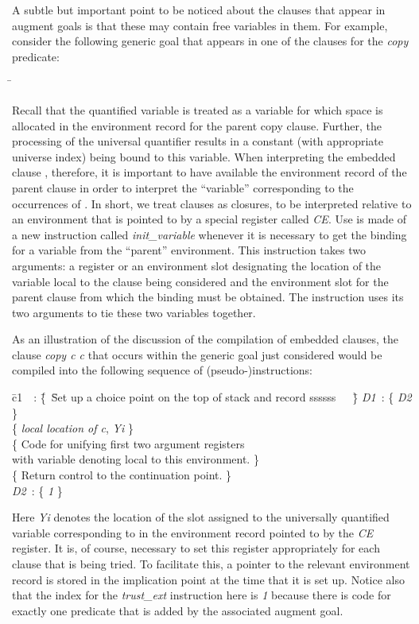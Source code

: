 A subtle but important point to be noticed about the clauses that
appear in augment goals is that these may contain free variables in
them. For example, consider the following generic goal that appears in
one of the clauses for the {\it copy} predicate:
\begin{tabbing}
\qquad\=\kill
\>
\end{tabbing}
Recall that the quantified variable  is treated as a variable for
which space is allocated in the environment record for the parent copy
clause. Further, the processing of the universal quantifier results in
a constant (with appropriate universe index) being bound to this
variable. When interpreting the embedded clause ,
therefore, it is important to have available the environment record of
the parent clause in order to interpret the ``variable'' corresponding
to the occurrences of . In short, we treat clauses as closures, to
be interpreted relative to an environment that is pointed to by a
special register called {\it CE}. Use is made of a new instruction
called {\it init\_variable} whenever it is necessary to get the
binding for a variable from the ``parent'' environment. This
instruction takes two arguments: a register or an environment slot
designating the location of the variable local to the clause being
considered and the environment slot for the parent clause from which
the binding must be obtained. The instruction uses its two arguments
to tie these two variables together.

As an illustration of the discussion of the compilation of embedded
clauses, the clause {\it copy c c} that occurs within the generic goal
just considered would be compiled into the following sequence of
(pseudo-)instructions:
\begin{tabbing}
\quad\= c1\ \ : \=\{\ \=Set up a choice point on the top of stack and record ssssss\ \ \ \=\}\kill
\> {\it D1}\ :  \>\{  {\it D2}                                            \>\} \\
\>              \>\{  {\it local location of
c}, {\it Yi} \>\} \\
\>              \>\{ \>Code for unifying first two argument registers \\
\>              \>   \> with variable denoting  local to this environment.                                      \>\} \\
\>              \>\{ \>Return control to the continuation point.  \>\} \\
\> {\it D2}\ :  \>\{  {\it 1}                                             \>\}

\end{tabbing}
Here {\it Yi} denotes the location of the slot assigned to the
universally quantified variable corresponding to  in the
environment record pointed to by the {\it CE} register. It is, of
course, necessary to set this register appropriately for each clause
that is being tried. To facilitate this, a pointer to the relevant
environment record is stored in the implication point at the time that
it is set up. Notice also that the index for the {\it trust\_ext}
instruction here is {\it 1} because there is code for exactly one
predicate that is added by the associated augment goal.


